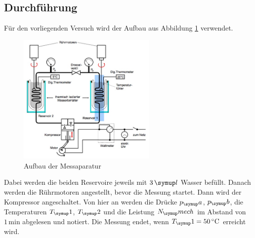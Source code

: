\subsection{Durchführung}
Für den vorliegenden Versuch wird der Aufbau aus Abbildung \ref{fig:2} verwendet.
\begin{figure}
  \centering
  \includegraphics[width=0.6\textwidth]{Bilder/aufbau.jpg}
  \caption{Aufbau der Messaparatur \,\cite{206}}
  \label{fig:2}
\end{figure}
Dabei werden die beiden Reservoire jeweils mit $3 \,\su{l}$ Wasser befüllt. Danach
werden die Rührmotoren angestellt, bevor die Messung startet. Dann wird der Kompressor
angeschaltet. Von hier an werden die Drücke $p_\su{a}$, $p_\su{b}$, die Temperaturen
$T_\su{1}$, $T_\su{2}$ und die Leistung $N_\su{mech}$ im Abstand von $1\,\si{\minute}$
abgelesen und notiert. Die Messung endet, wenn $T_\su{1} = 50\,\si{\celsius}$ erreicht wird.
